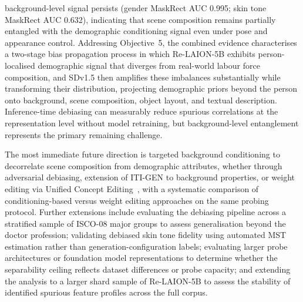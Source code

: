 background-level signal persists (gender MaskRect AUC 0.995; skin tone MaskRect AUC
0.632), indicating that scene composition remains partially entangled with the demographic
conditioning signal even under pose and appearance control. Addressing Objective~5, the
combined evidence characterises a two-stage bias propagation process in which Re-LAION-5B
exhibits person-localised demographic signal that diverges from real-world labour force
composition, and SDv1.5 then amplifies these imbalances substantially while transforming
their distribution, projecting demographic priors beyond the person onto background,
scene composition, object layout, and textual description. Inference-time debiasing can
measurably reduce spurious correlations at the representation level without model
retraining, but background-level entanglement represents the primary remaining challenge.

The most immediate future direction is targeted background conditioning to decorrelate
scene composition from demographic attributes, whether through adversarial debiasing,
extension of ITI-GEN to background properties, or weight editing via Unified Concept
Editing~\cite{Gandikota_2024_UCE}, with a systematic comparison of conditioning-based
versus weight editing approaches on the same probing protocol. Further extensions include
evaluating the debiasing pipeline across a stratified sample of ISCO-08 major groups to
assess generalisation beyond the doctor profession; validating debiased skin tone fidelity
using automated MST estimation rather than generation-configuration labels; evaluating
larger probe architectures or foundation model representations to determine whether the
separability ceiling reflects dataset differences or probe capacity; and extending the
analysis to a larger shard sample of Re-LAION-5B to assess the stability of identified
spurious feature profiles across the full corpus.
